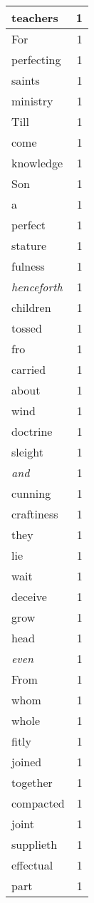 \begin{center}
\begin{longtable}{l|r}
teachers & 1\\ \hline 
For & 1\\ \hline 
perfecting & 1\\ \hline 
saints & 1\\ \hline 
ministry & 1\\ \hline 
Till & 1\\ \hline 
come & 1\\ \hline 
knowledge & 1\\ \hline 
Son & 1\\ \hline 
a & 1\\ \hline 
perfect & 1\\ \hline 
stature & 1\\ \hline 
fulness & 1\\ \hline 
\emph{henceforth} & 1\\ \hline 
children & 1\\ \hline 
tossed & 1\\ \hline 
fro & 1\\ \hline 
carried & 1\\ \hline 
about & 1\\ \hline 
wind & 1\\ \hline 
doctrine & 1\\ \hline 
sleight & 1\\ \hline 
\emph{and} & 1\\ \hline 
cunning & 1\\ \hline 
craftiness & 1\\ \hline 
they & 1\\ \hline 
lie & 1\\ \hline 
wait & 1\\ \hline 
deceive & 1\\ \hline 
grow & 1\\ \hline 
head & 1\\ \hline 
\emph{even} & 1\\ \hline 
From & 1\\ \hline 
whom & 1\\ \hline 
whole & 1\\ \hline 
fitly & 1\\ \hline 
joined & 1\\ \hline 
together & 1\\ \hline 
compacted & 1\\ \hline 
joint & 1\\ \hline 
supplieth & 1\\ \hline 
effectual & 1\\ \hline 
part & 1\\ \hline 

\end{longtable}
\end{center}
